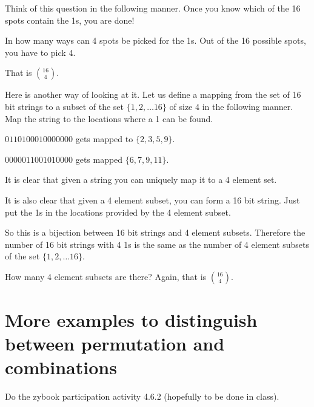 \documentclass[12pt]{article}
\begin{document}
Think of this question in the following manner. Once you know which of the 16 spots contain the 1s, you are done!

In how many ways can 4 spots be picked for the 1s. Out of the 16 possible spots, you have to pick 4.

That is $\binom{16}{4}$.

Here is another way of looking at it. Let us define a mapping from the set of 16 bit strings to a subset of the set $\{1,2,\ldots 16\}$ of size 4 in the following manner. Map the string to the locations where a 1 can be found.

$0110100010000000$ gets mapped to $\{2,3,5,9\}$.

$0000 0110 0101 0000$ gets mapped $\{6,7,9,11\}$.

It is clear that given a string you can uniquely map it to a 4 element set.

It is also clear that given a 4 element subset, you can form a 16 bit string. Just put the 1s in the locations provided by the 4 element subset.

So this is a bijection between 16 bit strings and 4 element subsets. Therefore the number of 16 bit strings with 4 1s is the same as the number of 4 element subsets of the set $\{1,2,\ldots 16\}$.

How many 4 element subsets are there? Again, that is $\binom{16}{4}$.


\section*{More examples to distinguish between permutation and combinations}

Do the zybook participation activity 4.6.2 (hopefully to be done in class).
\end{document}
